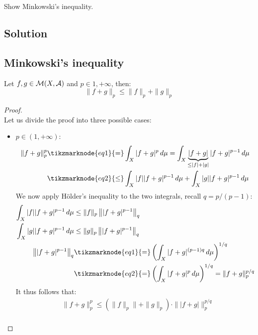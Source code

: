 
\question
Show Minkowski's inequality.

\subsection*{Solution}

\subsection{Minkowski's inequality}
Let $f,g \in \mathcal{M}(X,\mathcal{A})$ and $p\in{1,+\infty}$, then:
\[ \| f + g \|_p \leq \| f \|_p + \| g \|_p \]

\begin{proof}
    \hspace*{\fill}\\ %
    Let us divide the proof into three possible cases:
    \begin{itemize}
        \item $p\in(1,+\infty)$:
            \begin{align*}
                \|f+g\|_p^p & \tikzmarknode{eq1}{=} \int_X |f+g|^p \, d\mu = \int_X \underbrace{|f+g|}_{\leq |f| + |g|} |f+g|^{p-1} \, d\mu \\
                & \tikzmarknode{eq2}{\leq} \int_X |f| |f+g|^{p-1} \, d\mu + \int_X |g| |f+g|^{p-1} \, d\mu
            \end{align*}
            We now apply Hölder's inequality to the two integrals, recall $q=p/(p-1)$:
            \begin{align*}
                \int_X |f| |f+g|^{p-1} \, d\mu &\leq \|f\|_p \left\| |f+g|^{p-1} \right\|_q \\
                \int_X |g| |f+g|^{p-1} \, d\mu &\leq \|g\|_p \left\| |f+g|^{p-1} \right\|_q \\
                \left\| |f+g|^{p-1} \right\|_q & \tikzmarknode{eq1}{=} \left( \int_X |f+g|^{(p-1)q} \, d\mu \right)^{1/q} \\
                & \tikzmarknode{eq2}{=} \left( \int_X |f+g|^p \, d\mu \right)^{1/q} = \|f+g\|_p^{p/q}
            \end{align*}
            It thus follows that:
            \begin{align*}
                & \|f+g\|_p^p \leq (\|f\|_p\|+\|g\|_p) \cdot \| |f+g| \|_p^{p/q} \\

\end{align*}
\end{itemize}
\end{proof}

